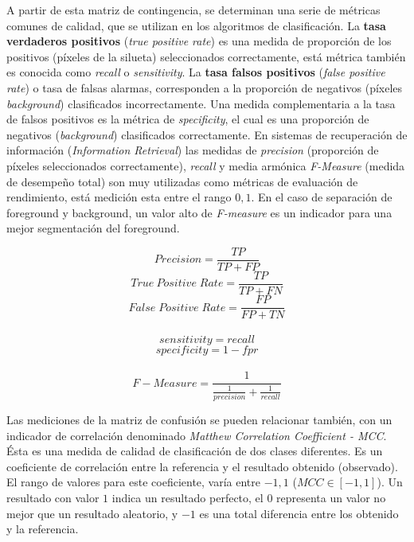 A partir de esta matriz de contingencia, se determinan una serie de métricas comunes de calidad, que se utilizan en los algoritmos de clasificación. La \textbf{tasa verdaderos positivos} (\textit{true positive rate}) es una medida de proporción de los positivos (píxeles de la silueta) seleccionados correctamente, está métrica también es conocida como \textit{recall} o \textit{sensitivity}. La \textbf{tasa falsos positivos} (\textit{false positive rate}) o tasa de falsas alarmas, corresponden a la proporción de negativos (píxeles \textit{background}) clasificados incorrectamente. Una medida complementaria a la tasa de falsos positivos es la métrica de \textit{specificity}, el cual es una proporción de negativos (\textit{background}) clasificados correctamente. En sistemas de recuperación de información (\emph{Information Retrieval}) las medidas de \emph{precision} (proporción de píxeles seleccionados correctamente), \emph{recall} y media armónica \emph{F-Measure} \cite{brutzer_evaluation_2011} \cite{herrero_background_2009} \cite{park_benchmark_2013} (medida de desempeño total) son muy utilizadas como métricas de evaluación de rendimiento, está medición esta entre el rango $0, 1$. En el caso de separación de foreground y background, un valor alto de \emph{F-measure} es un indicador para una mejor segmentación del foreground.



\begin{equation} \label{eq:precision}
Precision = \frac{TP}{TP + FP}
\end{equation}
\begin{equation} \label{eq:tpr}
True \: Positive \; Rate = \frac{TP}{TP+FN}
\end{equation}
\begin{equation} \label{eq:fpr}
False \; Positive \; Rate = \frac{FP}{FP + TN}
\end{equation}\\
\[
sensitivity = recall 
\]
\[
specificity = 1 - fpr
\]\\
\begin{equation} \label{eq:fmeasure}
F-Measure = \frac{1}{\frac{1}{precision} + \frac{1}{recall}}
\end{equation}

Las mediciones de la matriz de confusión se pueden relacionar también, con un indicador de correlación denominado \emph{Matthew Correlation Coefficient - MCC}. Ésta es una medida de calidad de clasificación de dos clases diferentes. Es un coeficiente de correlación entre la referencia y el resultado obtenido (observado). El rango de valores para este coeficiente, varía entre $-1, 1$ ($MCC \in [-1,1]$). Un resultado con valor $1$ indica un resultado perfecto, el $0$ representa un valor no mejor que un resultado aleatorio, y $-1$ es una total diferencia entre los obtenido y la referencia.

